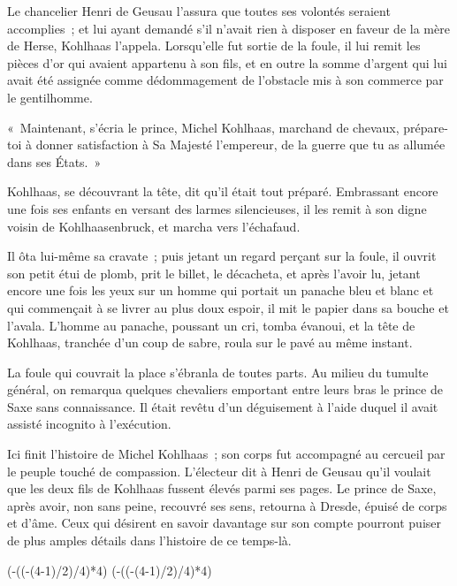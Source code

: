 \documentclass[french,twoside]{book} %
\newcommand\chapterclose{} %
\def\truncdiv#1#2{((#1-(#2-1)/2)/#2)}
\def\moduloop#1#2{(#1-\truncdiv{#1}{#2}*#2)}
\def\modulo#1#2{\number\numexpr\moduloop{#1}{#2}\relax}
\begin{document}
Le chancelier Henri de Geusau l’assura que toutes ses volontés seraient accomplies ; et lui ayant demandé s’il n’avait rien à disposer en faveur de la mère de Herse, Kohlhaas l’appela. Lorsqu’elle fut sortie de la foule, il lui remit les pièces d’or qui avaient appartenu à son fils, et en outre la somme d’argent qui lui avait été assignée comme dédommagement de l’obstacle mis à son commerce par le gentilhomme.\par
« Maintenant, s’écria le prince, Michel Kohlhaas, marchand de chevaux, prépare-toi à donner satisfaction à Sa Majesté l’empereur, de la guerre que tu as allumée dans ses États. »\par
Kohlhaas, se découvrant la tête, dit qu’il était tout préparé. Embrassant encore une fois ses enfants en versant des larmes silencieuses, il les remit à son digne voisin de Kohlhaasenbruck, et marcha vers l’échafaud.\par
Il ôta lui-même sa cravate ; puis jetant un regard perçant sur la foule, il ouvrit son petit étui de plomb, prit le billet, le décacheta, et après l’avoir lu, jetant encore une fois les yeux sur un homme qui portait un panache bleu et blanc et qui commençait à se livrer au plus doux espoir, il mit le papier dans sa bouche et l’avala. L’homme au panache, poussant un cri, tomba évanoui, et la tête de Kohlhaas, tranchée d’un coup de sabre, roula sur le pavé au même instant.\par
La foule qui couvrait la place s’ébranla de toutes parts. Au milieu du tumulte général, on remarqua quelques chevaliers emportant entre leurs bras le prince de Saxe sans connaissance. Il était revêtu d’un déguisement à l’aide duquel il avait assisté incognito à l’exécution.\par
Ici finit l’histoire de Michel Kohlhaas ; son corps fut accompagné au cercueil par le peuple touché de compassion. L’électeur dit à Henri de Geusau qu’il voulait que les deux fils de Kohlhaas fussent élevés parmi ses pages. Le prince de Saxe, après avoir, non sans peine, recouvré ses sens, retourna à Dresde, épuisé de corps et d’âme. Ceux qui désirent en savoir davantage sur son compte pourront puiser de plus amples détails dans l’histoire de ce temps-là.
\chapterclose

 


\ifbooklet
  \pagestyle{empty}
  \clearpage
  \ifnum\modulo{\value{page}}{4}=0 \hbox{}\newpage\hbox{}\newpage\fi
  \ifnum\modulo{\value{page}}{4}=1 \hbox{}\newpage\hbox{}\newpage\fi
\end{document}
